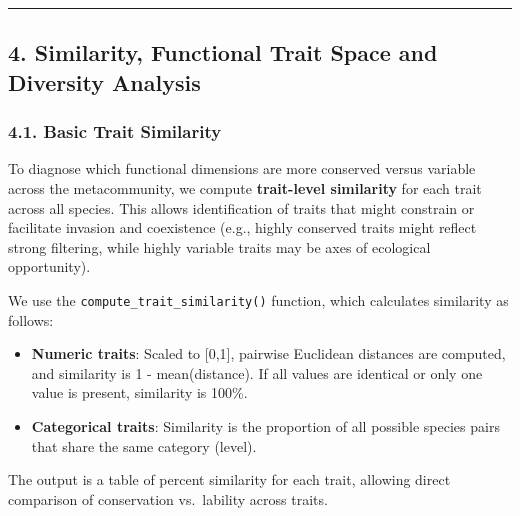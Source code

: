 \documentclass[
]{article}
\providecommand{\tightlist}{%
  \setlength{\itemsep}{0pt}\setlength{\parskip}{0pt}}
\begin{document}
\begin{center}\rule{0.5\linewidth}{0.5pt}\end{center}

\hypertarget{similarity-functional-trait-space-and-diversity-analysis}{%
\subsection{4. Similarity, Functional Trait Space and Diversity
Analysis}\label{similarity-functional-trait-space-and-diversity-analysis}}

\hypertarget{basic-trait-similarity}{%
\subsubsection{4.1. Basic Trait
Similarity}\label{basic-trait-similarity}}

To diagnose which functional dimensions are more conserved versus
variable across the metacommunity, we compute \textbf{trait-level
similarity} for each trait across all species. This allows
identification of traits that might constrain or facilitate invasion and
coexistence (e.g., highly conserved traits might reflect strong
filtering, while highly variable traits may be axes of ecological
opportunity).

We use the \texttt{compute\_trait\_similarity()} function, which
calculates similarity as follows:

\begin{itemize}
\tightlist
\item
  \textbf{Numeric traits}: Scaled to {[}0,1{]}, pairwise Euclidean
  distances are computed, and similarity is 1 - mean(distance). If all
  values are identical or only one value is present, similarity is
  100\%.
\item
  \textbf{Categorical traits}: Similarity is the proportion of all
  possible species pairs that share the same category (level).
\end{itemize}

The output is a table of percent similarity for each trait, allowing
direct comparison of conservation vs.~lability across traits.
\end{document}
